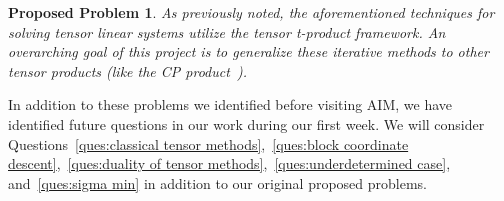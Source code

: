 \documentclass[10.5pt]{amsart}
\newtheorem{PropProb}{Proposed Problem}
\begin{document}
\begin{PropProb}
    As previously noted, the aforementioned techniques for solving tensor linear systems utilize the tensor t-product framework. An overarching goal of this project is to generalize these iterative methods to other tensor products (like the CP product~\cite{kolda2009tensor}).
\end{PropProb}

In addition to these problems we identified before visiting AIM, we have identified future questions in our work during our first week.  We will consider Questions~\ref{ques:classical tensor methods},~\ref{ques:block coordinate descent},~\ref{ques:duality of tensor methods},~\ref{ques:underdetermined case}, and~\ref{ques:sigma min} in addition to our original proposed problems.



\end{document}
